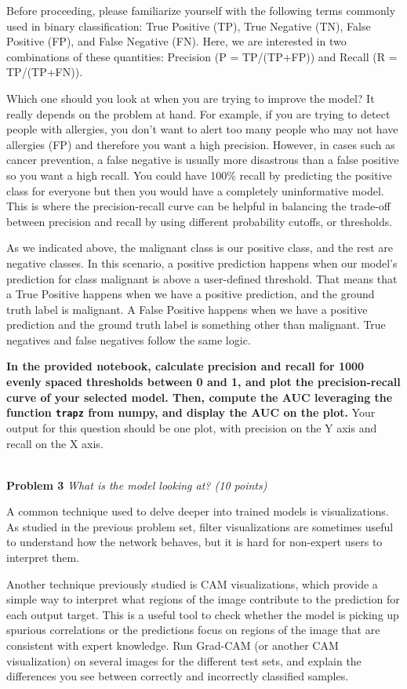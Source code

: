 \documentclass[11pt]{article}
\newcommand{\hwproblem}[2] {\noindent \\ {\bf #1} {\it #2}}
\begin{document}
Before proceeding, please familiarize yourself with the following terms commonly used in binary classification: True Positive (TP), True Negative (TN), False Positive (FP), and False Negative (FN). Here, we are interested in two combinations of these quantities: Precision (P = TP/(TP+FP)) and Recall (R = TP/(TP+FN)). 

Which one should you look at when you are trying to improve the model? It really depends on the problem at hand. For example, if you are trying to detect people with allergies, you don't want to alert too many people who may not have allergies (FP) and therefore you want a high precision. However, in cases such as cancer prevention, a false negative is usually more disastrous than a false positive so you want a high recall. You could have 100\% recall by predicting the positive class for everyone but then you would have a completely uninformative model. This is where the precision-recall curve can be helpful in balancing the trade-off between precision and recall by using different probability cutoffs, or thresholds.

As we indicated above, the malignant class is our positive class, and the rest are negative classes. In this scenario, a positive prediction happens when our model's prediction for class malignant is above a user-defined threshold. That means that a True Positive happens when we have a positive prediction, and the ground truth label is malignant. A False Positive happens when we have a positive prediction and the ground truth label is something other than malignant. True negatives and false negatives follow the same logic.

 \textbf{In the provided notebook, calculate precision and recall for 1000 evenly spaced thresholds between 0 and 1, and plot the precision-recall curve of your selected model. Then, compute the AUC leveraging the function \texttt{trapz} from numpy, and display the AUC on the plot.} Your output for this question should be one plot, with precision on the Y axis and recall on the X axis.

\hwproblem{Problem 3}{What is the model looking at? (10 points)}

A common technique used to delve deeper into trained models is visualizations. As studied in the previous problem set, filter visualizations are sometimes useful to understand how the network behaves, but it is hard for non-expert users to interpret them.

Another technique previously studied is CAM visualizations, which provide a simple way to interpret what regions of the image contribute to the prediction for each output target. This is a useful tool to check whether the model is picking up spurious correlations or the predictions focus on regions of the image that are consistent with expert knowledge. 
Run Grad-CAM (or another CAM visualization) on several images for the different test sets, and explain the differences you see between correctly and incorrectly classified samples.
\end{document}
